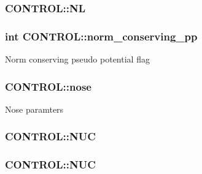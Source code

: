 \hypertarget{struct_c_o_n_t_r_o_l_a333f2cfda31a4f00d484ba72f92d1e2f}{
\subsubsection[{N\-L}]{ C\-O\-N\-T\-R\-O\-L\-::\-N\-L}}\label{struct_c_o_n_t_r_o_l_a333f2cfda31a4f00d484ba72f92d1e2f}
\hypertarget{struct_c_o_n_t_r_o_l_a4dcd2fa6ee85809b2063bec7bf12e0f9}{
\subsubsection[{norm\-\_\-conserving\-\_\-pp}]{\setlength{\rightskip}{0pt plus 5cm}int C\-O\-N\-T\-R\-O\-L\-::norm\-\_\-conserving\-\_\-pp}}\label{struct_c_o_n_t_r_o_l_a4dcd2fa6ee85809b2063bec7bf12e0f9}
Norm conserving pseudo potential flag \hypertarget{struct_c_o_n_t_r_o_l_a0e8fe07fbdecdf8f61f0131b085742c5}{
\subsubsection[{nose}]{ C\-O\-N\-T\-R\-O\-L\-::nose}}\label{struct_c_o_n_t_r_o_l_a0e8fe07fbdecdf8f61f0131b085742c5}
Nose paramters \hypertarget{struct_c_o_n_t_r_o_l_ae987c121634cc4c93a1fc4911b3ce2ac}{
\subsubsection[{N\-U\-C}]{ C\-O\-N\-T\-R\-O\-L\-::\-N\-U\-C}}\label{struct_c_o_n_t_r_o_l_ae987c121634cc4c93a1fc4911b3ce2ac}
\hypertarget{struct_c_o_n_t_r_o_l_a3e4ad3e671e11f295269a6997234ae51}{
\subsubsection[{N\-U\-C}]{ C\-O\-N\-T\-R\-O\-L\-::\-N\-U\-C}}\label{struct_c_o_n_t_r_o_l_a3e4ad3e671e11f295269a6997234ae51}
